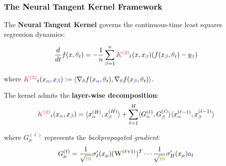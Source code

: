 \documentclass[a4paper]{article}
\theoremstyle{plain}
\theoremstyle{definition}
\theoremstyle{remark}
\begin{document}
\subsubsection{The Neural Tangent Kernel Framework}

\begin{tcolorbox}[colback=kernelcolor!5,colframe=kernelcolor!50!black,title={\textbf{Second-Order Kernel Definition}},enhanced,drop shadow]
The \textbf{Neural Tangent Kernel} governs the continuous-time least squares regression dynamics:

\begin{equation}
\label{eq:ntk_dynamics}
\frac{d}{dt} f(x, \textcolor{weightcolor}{\theta}_t) = -\frac{1}{n}\sum_{\textcolor{blue}{\beta}=1}^n \textcolor{kernelcolor}{\textcolor{kernelcolor}{K}^{(2)}}_t(x, x_{\textcolor{blue}{\beta}}) (f(x_{\textcolor{blue}{\beta}}, \textcolor{weightcolor}{\theta}_t) - y_{\textcolor{blue}{\beta}})
\end{equation}

where $\textcolor{kernelcolor}{\textcolor{kernelcolor}{K}^{(2)}}_t(x_{\textcolor{blue}{\alpha}}, x_{\textcolor{blue}{\beta}}) := \langle \nabla_{\textcolor{weightcolor}{\theta}} f(x_{\textcolor{blue}{\alpha}}, \textcolor{weightcolor}{\theta}_t), \nabla_{\textcolor{weightcolor}{\theta}} f(x_{\textcolor{blue}{\beta}}, \textcolor{weightcolor}{\theta}_t) \rangle$.
\end{tcolorbox}

The kernel admits the \textbf{layer-wise decomposition}:
\begin{equation}
\label{eq:ntk_decomposition}
\textcolor{kernelcolor}{\textcolor{kernelcolor}{K}^{(2)}}_t(x_{\textcolor{blue}{\alpha}}, x_{\textcolor{blue}{\beta}}) = \langle x^{(H)}_{\textcolor{blue}{\alpha}}, x^{(H)}_{\textcolor{blue}{\beta}} \rangle + \sum_{\ell=1}^{H} \langle G^{(\ell)}_{\textcolor{blue}{\alpha}}, G^{(\ell)}_{\textcolor{blue}{\beta}} \rangle \langle x^{(\ell-1)}_{\textcolor{blue}{\alpha}}, x^{(\ell-1)}_{\textcolor{blue}{\beta}} \rangle
\end{equation}

where $G^{(\ell)}_\mu$ represents the \textit{backpropagated gradient}:
\begin{equation}
\label{eq:backprop_gradient}
G^{(\ell)}_\mu = \frac{1}{\sqrt{\textcolor{darkyellow}{m}}}\sigma'_\ell(x_\mu) (\textcolor{weightcolor}{\mathbf{W}}^{(\ell+1)})^T \cdots \frac{1}{\sqrt{\textcolor{darkyellow}{m}}}\sigma'_H(x_\mu) \textcolor{blue}{a}_t
\end{equation}
\end{document}
